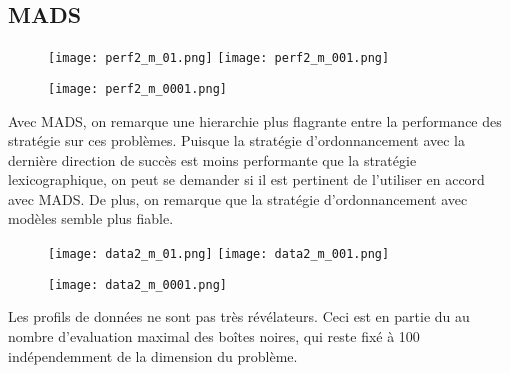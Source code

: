 \documentclass[letterpaper]{scrartcl}
\begin{document}
\subsection{MADS}
	\begin{figure}[h]
	\texttt{[image: perf2\_m\_01.png]}
	\texttt{[image: perf2\_m\_001.png]}
\end{figure}
\begin{figure}[h]
	\texttt{[image: perf2\_m\_0001.png]}
	\centering
\end{figure}
\FloatBarrier
Avec MADS, on remarque une hierarchie plus flagrante entre la performance des stratégie sur ces problèmes. Puisque la stratégie d'ordonnancement avec la dernière direction de succès est moins performante que la stratégie lexicographique, on peut se demander si il est pertinent de l'utiliser en accord avec MADS. De plus, on remarque que la stratégie d'ordonnancement avec modèles semble plus fiable.
\begin{figure}[h]
	\texttt{[image: data2\_m\_01.png]}
	\texttt{[image: data2\_m\_001.png]}\\
\end{figure}
\begin{figure}[h]
	\texttt{[image: data2\_m\_0001.png]}
	\centering
\end{figure}
\FloatBarrier
Les profils de données ne sont pas très révélateurs. Ceci est en partie du au nombre d'evaluation maximal des boîtes noires, qui reste fixé à 100 indépendemment de la dimension du problème. 



\end{document}
